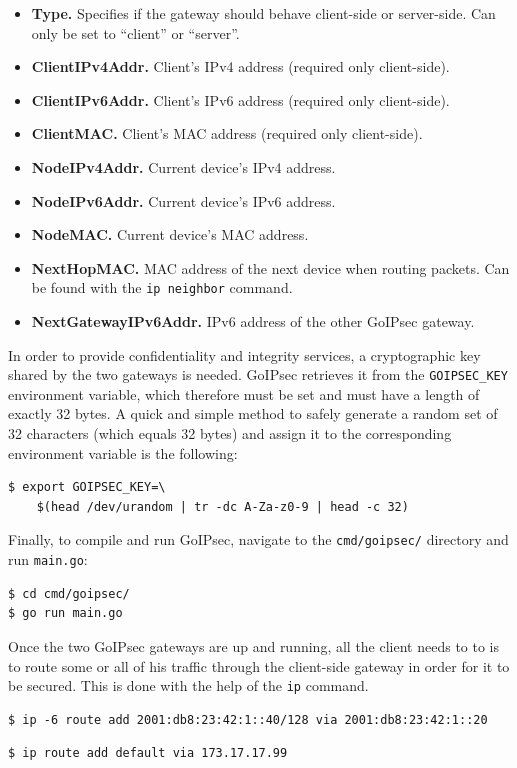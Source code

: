\documentclass[a4paper,12pt]{report}
\newcommand{\quotes}[1]{``#1''}
\begin{document}
		\begin{itemize}
		\item \textbf{Type.} Specifies if the gateway should behave client-side or server-side. Can only be set to \quotes{client} or \quotes{server}.
		\item \textbf{ClientIPv4Addr.} Client's IPv4 address (required only client-side).
		\item \textbf{ClientIPv6Addr.} Client's IPv6 address (required only client-side).
		\item \textbf{ClientMAC.} Client's MAC address (required only client-side).
		\item \textbf{NodeIPv4Addr.} Current device's IPv4 address.
		\item \textbf{NodeIPv6Addr.} Current device's IPv6 address.
		\item \textbf{NodeMAC.} Current device's MAC address.
		\item \textbf{NextHopMAC.} MAC address of the next device when routing packets. Can be found with the \texttt{ip neighbor} command.
		\item \textbf{NextGatewayIPv6Addr.} IPv6 address of the other GoIPsec gateway.
		\end{itemize}
		
		In order to provide confidentiality and integrity services, a cryptographic key shared by the two gateways is needed. GoIPsec retrieves it from the \texttt{GOIPSEC\_KEY} environment variable, which therefore must be set and must have a length of exactly 32 bytes. A quick and simple method to safely generate a random set of 32 characters (which equals 32 bytes) and assign it to the corresponding environment variable is the following:
		\begin{lstlisting}[caption=Randomly generate \texttt{GOIPSEC\_KEY}.]
$ export GOIPSEC_KEY=\
	$(head /dev/urandom | tr -dc A-Za-z0-9 | head -c 32)
		\end{lstlisting}
		Finally, to compile and run GoIPsec, navigate to the \texttt{cmd/goipsec/} directory and run \texttt{main.go}:
		\begin{lstlisting}[caption=Compile and run GoIPsec.]
$ cd cmd/goipsec/
$ go run main.go
		\end{lstlisting}
		Once the two GoIPsec gateways are up and running, all the client needs to to is to route some or all of his traffic through the client-side gateway in order for it to be secured. This is done with the help of the \texttt{ip} command.
				\begin{lstlisting}[caption=Route IPv6 traffic destined for \texttt{2001:db8:23:42:1::40} through the GoIPsec gateway available at \texttt{2001:db8:23:42:1::20}.]
$ ip -6 route add 2001:db8:23:42:1::40/128 via 2001:db8:23:42:1::20
		\end{lstlisting}
		
			\begin{lstlisting}[caption=Route all IPv4 traffic through the GoIPsec gateway with address \texttt{173.17.17.99}.]
$ ip route add default via 173.17.17.99
		\end{lstlisting}
		


\end{document}

